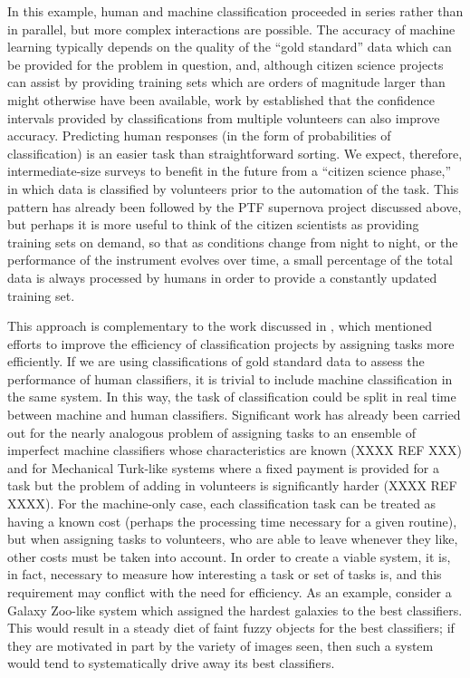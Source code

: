 \documentclass{ar2e}
\begin{document}
In this example, human and machine classification proceeded in series rather
than in parallel, but more complex interactions are possible. The accuracy of
machine learning typically depends on the quality of the ``gold standard''
data which can be provided for the problem in question, and, although citizen
science projects can assist by providing training sets which are orders of
magnitude larger than might otherwise have been available, work by
\citet{Banerji++2010} established that the confidence intervals provided by
classifications from multiple volunteers can also improve accuracy. Predicting
human responses (in the form of probabilities of classification) is an easier
task than straightforward sorting. We expect, therefore, intermediate-size
surveys to benefit in the future from a ``citizen science phase,'' in which
data is classified by volunteers prior to the automation of the task. This
pattern has already been followed by the PTF supernova project discussed
above, but perhaps it is more useful to think of the citizen scientists as
providing training sets on demand, so that as conditions change from night to
night, or the performance of the instrument evolves over time, a small
percentage of the total data is always processed by humans in order to provide
a constantly updated training set. 

This approach is complementary to the work discussed in
, which mentioned efforts to improve the efficiency of
classification projects by assigning tasks more efficiently. If we are using
classifications of gold standard data to assess the performance of human
classifiers, it is trivial to include machine classification in the same system.
In this way, the task of classification could be split in real time between
machine and human classifiers. Significant work has already been carried out for
the nearly analogous problem of assigning tasks to an ensemble of imperfect
machine classifiers whose characteristics are known (XXXX REF XXX) and for
Mechanical Turk-like systems where a fixed payment is provided for a task but
the problem of adding in volunteers is significantly harder (XXXX REF XXXX). For
the machine-only case, each classification task can be treated as having a known
cost (perhaps the processing time necessary for a given routine), but when
assigning tasks to  volunteers, who are able to leave whenever they like, other
costs must be taken into account. In order to create a viable system, it is, in
fact, necessary to measure how interesting a task or set of tasks is, and this
requirement may conflict with the need for efficiency. As an example, consider a
Galaxy Zoo-like system which assigned the hardest galaxies to the best
classifiers. This would result in a steady diet of faint fuzzy objects for the
best classifiers; if they are motivated in part by the variety of images seen,
then such a system would tend to systematically drive away its best
classifiers. 
\end{document}
